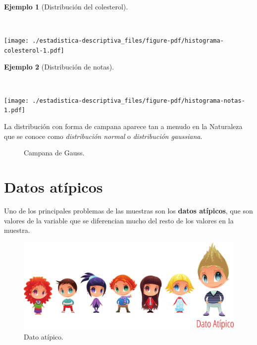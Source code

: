 \documentclass[
  a4paper,
]{scrreport}
\theoremstyle{definition}
\theoremstyle{definition}
\newtheorem{example}{Ejemplo}[chapter]
\theoremstyle{plain}
\theoremstyle{remark}
\begin{document}
\leavevmode{}%
\begin{example}[Distribución del
colesterol]\label{exm-distribucion-colesterol}

~

\texttt{[image: ./estadistica-descriptiva\_files/figure-pdf/histograma-colesterol-1.pdf]}

\end{example}

\leavevmode{}%
\begin{example}[Distribución de notas]\label{exm-distribucion-notas}

~

\texttt{[image: ./estadistica-descriptiva\_files/figure-pdf/histograma-notas-1.pdf]}

\end{example}

La distribución con forma de campana aparece tan a menudo en la
Naturaleza que se conoce como \emph{distribución normal} o
\emph{distribución gaussiana}.

\begin{figure}

{\centering 



}

\caption{Campana de Gauss.}

\end{figure}

\hypertarget{datos-atuxedpicos}{%
\section{Datos atípicos}\label{datos-atuxedpicos}}

Uno de los principales problemas de las muestras son los \textbf{datos
atípicos}, que son valores de la variable que se diferencian mucho del
resto de los valores en la muestra.

\begin{figure}

{\centering \includegraphics{./img/descriptiva/dato_atipico.png}

}

\caption{Dato atípico.}

\end{figure}
\end{document}
